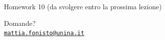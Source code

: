 \documentclass[10pt,aspectratio=169]{beamer}
\begin{document}
\begin{frame}{Homework 10 (da svolgere entro la prossima lezione)}
\begin{enumerate}
\end{enumerate}
\end{frame}

\begin{frame}
\begin{center}
{\Huge Domande?}\\[2em]
{\normalsize \href{mailto:mattia.fonisto@unina.it}{\texttt{mattia.fonisto@unina.it}}}
\end{center}
\end{frame}
\end{document}
